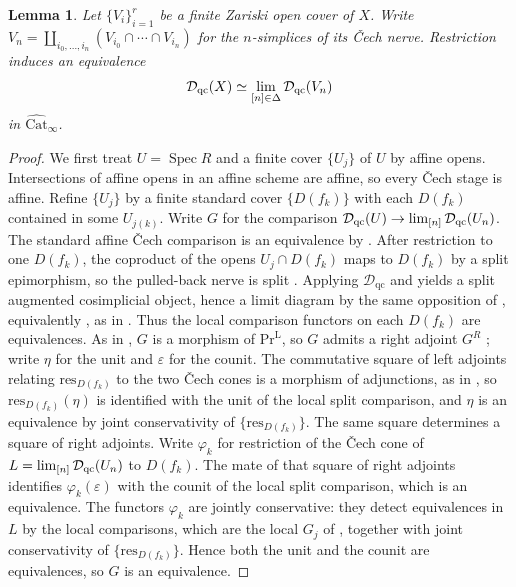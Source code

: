 \documentclass[11pt]{amsart}
\renewcommand{\lim}{\operatornamewithlimits{\rm{lim}}}
\newcommand{\Spec}{\operatorname{Spec}}
\renewcommand{\Pr}{\mathrm{Pr}}
\newcommand{\Catbig}{\widehat{\mathrm{Cat}}}
\newcommand{\Dqc}{\mathcal D_{\mathrm{qc}}}
\theoremstyle{plain}
\newtheorem{lemma}[lemma]{Lemma}
\theoremstyle{definition}
\numberwithin{equation}{section}
\begin{document}
\begin{lemma}\label{lem:dqc-zariski}
Let $\{V_i\}_{i=1}^r$ be a finite Zariski open cover of $X$.
Write $V_n=\coprod_{i_0,\dots,i_n}(V_{i_0}\cap\cdots\cap V_{i_n})$ for the $n$-simplices of its \v Cech nerve.
Restriction induces an equivalence
\[
 \Dqc(X)\simeq\lim_{[n]\in\Delta}\Dqc(V_n)
\]
in $\Catbig_\infty$.
\end{lemma}
\begin{proof}
We first treat $U=\Spec R$ and a finite cover $\{U_j\}$ of $U$ by affine opens.
Intersections of affine opens in an affine scheme are affine, so every \v Cech stage is affine.
Refine $\{U_j\}$ by a finite standard cover $\{D(f_k)\}$ with each $D(f_k)$ contained in some $U_{j(k)}$.
Write $G$ for the comparison $\Dqc(U)\to\lim_{[n]}\Dqc(U_n)$.
The standard affine \v Cech comparison is an equivalence by .
After restriction to one $D(f_k)$, the coproduct of the opens $U_j\cap D(f_k)$ maps to $D(f_k)$ by a split epimorphism, so the pulled-back nerve is split \cite[Definition 4.7.2.2]{HA}.
Applying $\Dqc$ and  yields a split augmented cosimplicial object, hence a limit diagram by the same opposition of \cite[\href{https://kerodon.net/tag/04SH}{Tag 04SH}]{Kerodon}, equivalently \cite[Remark 4.7.2.3]{HA}, as in .
Thus the local comparison functors on each $D(f_k)$ are equivalences.
As in , $G$ is a morphism of $\Pr^{\mathrm L}$, so $G$ admits a right adjoint $G^R$ \cite[Corollary 5.5.2.9]{HTT}; write $\eta$ for the unit and $\varepsilon$ for the counit.
The commutative square of left adjoints relating $\mathrm{res}_{D(f_k)}$ to the two \v Cech cones is a morphism of adjunctions, as in , so $\mathrm{res}_{D(f_k)}(\eta)$ is identified with the unit of the local split comparison, and $\eta$ is an equivalence by joint conservativity of $\{\mathrm{res}_{D(f_k)}\}$.
The same square determines a square of right adjoints.
Write $\varphi_k$ for restriction of the \v Cech cone of $L=\lim_{[n]}\Dqc(U_n)$ to $D(f_k)$.
The mate of that square of right adjoints identifies $\varphi_k(\varepsilon)$ with the counit of the local split comparison, which is an equivalence.
The functors $\varphi_k$ are jointly conservative: they detect equivalences in $L$ by the local comparisons, which are the local $G_j$ of , together with joint conservativity of $\{\mathrm{res}_{D(f_k)}\}$.
Hence both the unit and the counit are equivalences, so $G$ is an equivalence.


\end{proof}
\end{document}
